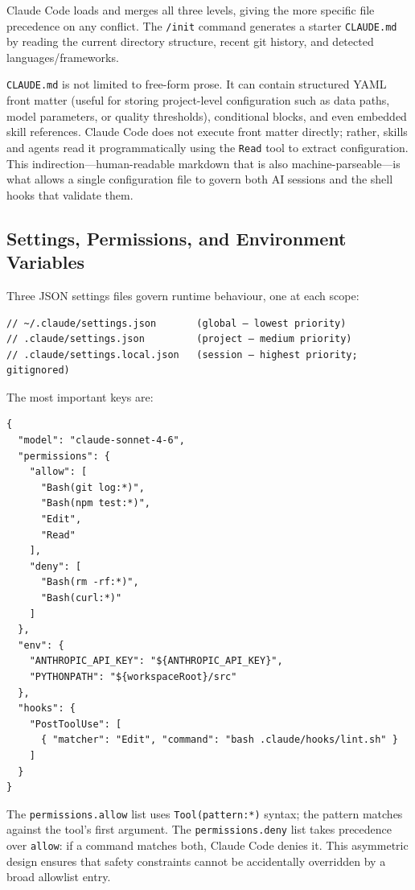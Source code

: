 Claude Code loads and merges all three levels, giving the more specific file
precedence on any conflict.  The \texttt{/init} command generates a starter
\texttt{CLAUDE.md} by reading the current directory structure, recent git
history, and detected languages/frameworks.

\begin{deepdive}
\texttt{CLAUDE.md} is not limited to free-form prose.  It can contain structured
YAML front matter (useful for storing project-level configuration such as data
paths, model parameters, or quality thresholds), conditional blocks, and even
embedded skill references.  Claude Code does not execute front matter
directly; rather, skills and agents read it programmatically using the
\texttt{Read} tool to extract configuration.  This indirection---human-readable
markdown that is also machine-parseable---is what allows a single configuration
file to govern both AI sessions and the shell hooks that validate them.
\end{deepdive}

\subsection{Settings, Permissions, and Environment Variables}
\label{app:claude-code:settings}

Three JSON settings files govern runtime behaviour, one at each scope:

\begin{verbatim}
// ~/.claude/settings.json       (global — lowest priority)
// .claude/settings.json         (project — medium priority)
// .claude/settings.local.json   (session — highest priority; gitignored)
\end{verbatim}

The most important keys are:

\begin{verbatim}
{
  "model": "claude-sonnet-4-6",
  "permissions": {
    "allow": [
      "Bash(git log:*)",
      "Bash(npm test:*)",
      "Edit",
      "Read"
    ],
    "deny": [
      "Bash(rm -rf:*)",
      "Bash(curl:*)"
    ]
  },
  "env": {
    "ANTHROPIC_API_KEY": "${ANTHROPIC_API_KEY}",
    "PYTHONPATH": "${workspaceRoot}/src"
  },
  "hooks": {
    "PostToolUse": [
      { "matcher": "Edit", "command": "bash .claude/hooks/lint.sh" }
    ]
  }
}
\end{verbatim}

The \texttt{permissions.allow} list uses \texttt{Tool(pattern:*)} syntax;
the pattern matches against the tool's first argument.  The
\texttt{permissions.deny} list takes precedence over \texttt{allow}: if a
command matches both, Claude Code denies it.  This asymmetric design ensures that safety
constraints cannot be accidentally overridden by a broad allowlist entry.

